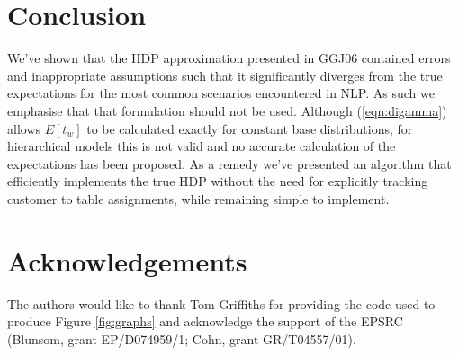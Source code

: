 \documentclass[11pt]{article}
\begin{document}
\section{Conclusion}
We've shown that the \mbox{HD}P approximation presented in GGJ06 contained errors and inappropriate assumptions such that it significantly diverges from the true expectations for the most common scenarios encountered in NLP.
As such we emphasise that that formulation should not be used.
Although (\ref{eqn:digamma}) allows $E[t_w]$ to be calculated exactly for constant base distributions, for hierarchical models this is not valid and no accurate calculation of the expectations has been proposed. 
As a remedy we've presented an algorithm that efficiently implements the true \mbox{HD}P without the need for explicitly tracking customer to table assignments, while remaining simple to implement.


\section*{Acknowledgements}
The authors would like to thank Tom Griffiths for providing the code used to produce Figure \ref{fig:graphs} and acknowledge the support of the EPSRC (Blunsom, grant EP/D074959/1; Cohn, grant GR/T04557/01).



\newcommand{\bibsnip}{\vspace{-1ex}}
\begin{small}

\end{small}
\end{document}
